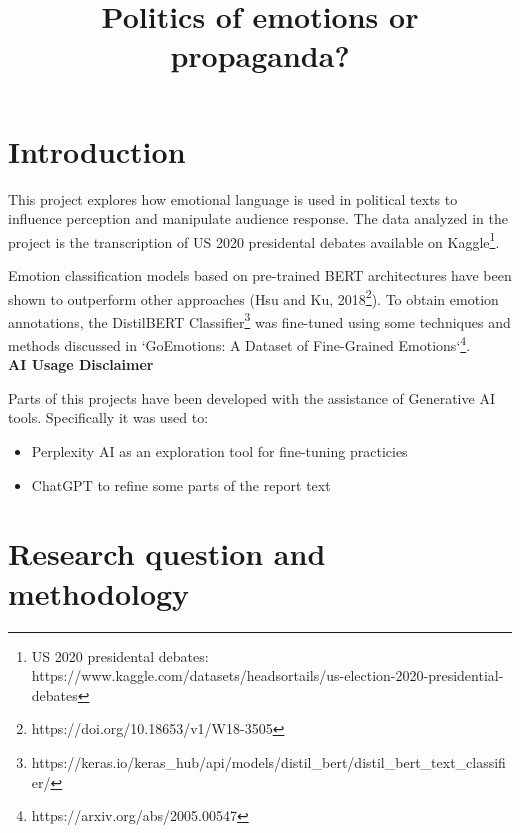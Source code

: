 \documentclass[pdflatex,sn-mathphys-num]{sn-jnl}%
\begin{document}
\title[Article Title]{Politics of emotions or propaganda?}

\author{ }



\maketitle

\section{Introduction}\label{sec1}

This project explores how emotional language is used in political texts to influence perception and manipulate audience response. The data analyzed in the project is the transcription of US 2020 presidental debates available on Kaggle\footnote{US 2020 presidental debates: \\ https://www.kaggle.com/datasets/headsortails/us-election-2020-presidential-debates}. 

Emotion classification models based on pre-trained BERT architectures have been shown to outperform other approaches (Hsu and Ku, 2018\footnote{https://doi.org/10.18653/v1/W18-3505}). To obtain emotion annotations, the DistilBERT Classifier\footnote{https://keras.io/keras_hub/api/models/distil_bert/distil_bert_text_classifier/} was fine-tuned using some techniques and methods discussed in `GoEmotions: A Dataset of Fine-Grained Emotions`\footnote{https://arxiv.org/abs/2005.00547}.\\ 

\textbf{AI Usage Disclaimer}

Parts of this projects have been developed with the assistance of Generative AI tools. Specifically it was used to:
\begin{itemize}
	\item Perplexity AI as an exploration tool for fine-tuning practicies
	\item ChatGPT to refine some parts of the report text
\end{itemize}


\section{Research question and methodology}\label{sec2}
\end{document}
